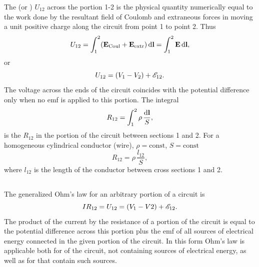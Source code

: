 The  (or ) $U_{12}$ across the portion 1-2 is the physical quantity numerically equal to the work done by the resultant field of Coulomb and extraneous forces in moving a unit positive charge along the circuit from point 1 to point 2. Thus
\begin{equation*}
U_{12}  = \int_{1}^{2} (\vb{E}_{\text{Coul}} + \vb{E}_{\text{extr}}) \, \dd \vb{l} = \int_{1}^{2} \vb{E} \, \dd \vb{l},
\end{equation*}
or
\begin{equation*}
U_{12}  = (V_{1} - V_{2}) + \mathscr{E}_{12}.
\end{equation*}
The voltage across the ends of the circuit coincides with the potential difference only when no emf is applied to this portion.
The integral
\begin{equation*}
R_{12} = \int_{1}^{2} \rho \, \frac{\dd \vb{l}}{S},
\end{equation*}
is the  $R_{12}$ in the portion of the circuit between sections 1 and 2. For a homogeneous cylindrical conductor (wire), $\rho = \text{const}$, $S = \text{const}$ 
\begin{equation*}
R_{12} =  \rho \, \frac{l_{12}}{S},
\end{equation*}
where $l_{12}$ is the length of the conductor between cross sections 1 and 2.

\subsection{}\label{21.2.3} The generalized Ohm's law for an arbitrary portion of a circuit is
\begin{equation*}
I R_{12} = U_{12} = (V_{1} - V2)+ \mathscr{E}_{12}.
\end{equation*}
The product of the current by the resistance of a portion of the circuit is equal to the potential difference across this portion plus the emf of all sources of electrical energy connected in the given portion of the circuit. In this form Ohm's law is applicable both for  of the circuit, not containing sources of electrical energy, as well as for  that contain such sources.

